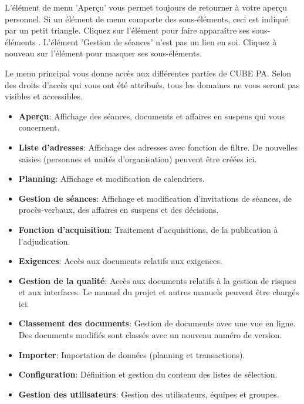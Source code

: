\vspace{\baselineskip}

L'élément de menu 'Aperçu'  vous permet toujours de retourner à votre aperçu personnel. Si un élément de menu comporte des sous-éléments, ceci est indiqué par un petit triangle. Cliquez sur l'élément pour faire apparaître ses sous-éléments . L'élément 'Gestion de séances' n'est pas un lien en soi. Cliquez à nouveau sur l'élément pour masquer ses sous-éléments.

\vspace{\baselineskip}

Le menu principal vous donne accès aux différentes parties de CUBE PA. Selon des droits d'accès qui vous ont été attribués, tous les domaines ne vous seront pas visibles et accessibles.

\begin{itemize}
\item
\textbf{Aperçu}: Affichage des séances, documents et affaires en suspens qui vous concernent.
\item
\textbf{Liste d'adresses}: Affichage des adresses avec fonction de filtre. De nouvelles saisies (personnes et unités d'organisation) peuvent être créées ici.
\item
\textbf{Planning}: Affichage et modification de calendriers.
\item
\textbf{Gestion de séances}: Affichage et modification d'invitations de séances, de procès-verbaux, des affaires en suspens et des 
décisions.
\item
\textbf{Fonction d'acquisition}: Traitement d'acquisitions, de la publication à l'adjudication.
\item
\textbf{Exigences}: Accès aux documents relatifs aux exigences.
\item
\textbf{Gestion de la qualité}: Accès aux documents relatifs à la gestion de risques et aux interfaces. Le manuel du projet et autres manuels peuvent être chargés ici.
\item
\textbf{Classement des documents}: Gestion de documents avec une vue en ligne. Des documents modifiés sont classés avec un nouveau numéro de version.
\item
\textbf{Importer}: Importation de données (planning et transactions).
\item
\textbf{Configuration}: Définition et gestion du contenu des listes de sélection.
\item
\textbf{Gestion des utilisateurs}: Gestion des utilisateurs, équipes et groupes.
\end{itemize}

